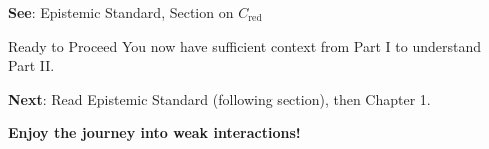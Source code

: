 \textbf{See}: Epistemic Standard, Section on $C_{\mathrm{red}}$


\begin{statusbox}{Ready to Proceed}
You now have sufficient context from Part I to understand Part II.

\textbf{Next}: Read Epistemic Standard (following section), then Chapter 1.

\textbf{Enjoy the journey into weak interactions!}
\end{statusbox}
